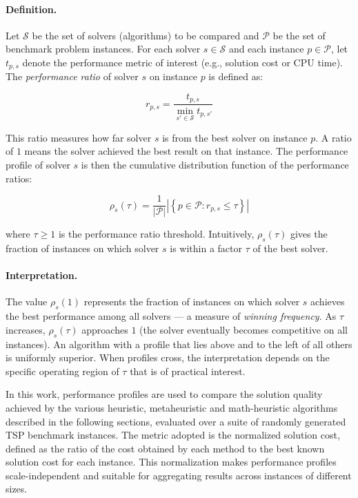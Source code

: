 \documentclass{article}
\begin{document}
\paragraph{Definition.}
Let $\mathcal{S}$ be the set of solvers (algorithms) to be compared and $\mathcal{P}$ be the
set of benchmark problem instances. For each solver $s \in \mathcal{S}$ and each instance
$p \in \mathcal{P}$, let $t_{p,s}$ denote the performance metric of interest (e.g.,
solution cost or CPU time). The \textit{performance ratio} of solver $s$ on instance $p$ is
defined as:

\[
r_{p,s} = \frac{t_{p,s}}{\min_{s' \in \mathcal{S}} t_{p,s'}}
\]

This ratio measures how far solver $s$ is from the best solver on instance $p$. A ratio of
$1$ means the solver achieved the best result on that instance. The performance profile of
solver $s$ is then the cumulative distribution function of the performance ratios:

\[
\rho_s(\tau) = \frac{1}{|\mathcal{P}|} \left| \left\{ p \in \mathcal{P} : r_{p,s} \leq \tau \right\} \right|
\]

where $\tau \geq 1$ is the performance ratio threshold. Intuitively, $\rho_s(\tau)$ gives
the fraction of instances on which solver $s$ is within a factor $\tau$ of the best solver.

\paragraph{Interpretation.}
The value $\rho_s(1)$ represents the fraction of instances on which solver $s$ achieves the
best performance among all solvers — a measure of \textit{winning frequency}. As $\tau$
increases, $\rho_s(\tau)$ approaches $1$ (the solver eventually becomes competitive on all
instances). An algorithm with a profile that lies above and to the left of all others is
uniformly superior. When profiles cross, the interpretation depends on the specific operating
region of $\tau$ that is of practical interest.

In this work, performance profiles are used to compare the solution quality achieved by the
various heuristic, metaheuristic and math-heuristic algorithms described in the following sections, evaluated
over a suite of randomly generated TSP benchmark instances. The metric adopted is the normalized solution cost,
defined as the ratio of the cost obtained by each method to the best known solution cost for
each instance. This normalization makes performance profiles scale-independent and suitable
for aggregating results across instances of different sizes.
\end{document}
